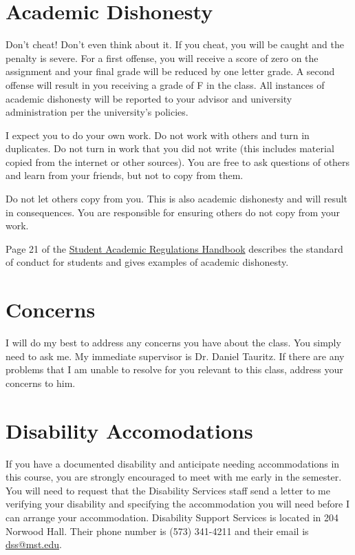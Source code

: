 \documentclass{article}
\begin{document}
\section{Academic Dishonesty}
Don't cheat! Don't even think about it.
If you cheat, you will be caught and the penalty is severe.
For a first offense, you will receive a score of zero on the assignment and your final grade will be reduced by one letter grade.
A second offense will result in you receiving a grade of F in the class.
All instances of academic dishonesty will be reported to your advisor and university administration per the university's policies.

I expect you to do your own work.
Do not work with others and turn in duplicates.
Do not turn in work that you did not write (this includes material copied from the internet or other sources).
You are free to ask questions of others and learn from your friends, but not to copy from them.

Do not let others copy from you.
This is also academic dishonesty and will result in consequences.
You are responsible for ensuring others do not copy from your work.

Page 21 of the \href{http://registrar.mst.edu/academicregs/index.html}{Student Academic Regulations Handbook} describes the standard of conduct for students and gives examples of academic dishonesty.

\section{Concerns}
I will do my best to address any concerns you have about the class.
You simply need to ask me.
My immediate supervisor is Dr. Daniel Tauritz. If there are any problems that I am unable to resolve for you relevant to this class, address your concerns to him.

\section{Disability Accomodations}
If you have a documented disability and anticipate needing accommodations in this course, you are strongly encouraged to meet with me early in the semester.
You will need to request that the Disability Services staff send a letter to me verifying your disability and specifying the accommodation you will need before I can arrange your accommodation.
Disability Support Services is located in 204 Norwood Hall.
Their phone number is (573) 341-4211 and their email is \href{mailto:dss@mst.edu}{dss@mst.edu}.
\end{document}
